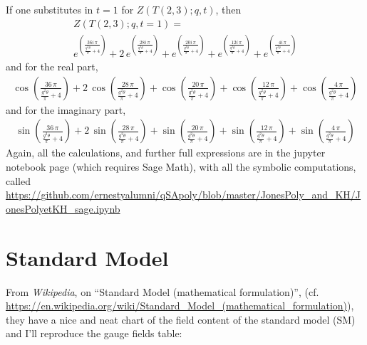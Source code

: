 \documentclass[10pt]{amsart}
\begin{document}
\begin{multicols}{2}

  If one substitutes in $t=1$ for $Z(T(2,3);q,t)$, then
  \[
\begin{gathered}
  Z(T(2,3);q,t=1) = \\
e^{\left(\frac{36 i \, \pi}{\frac{g^{2} \theta}{\pi} + 4}\right)} + 2 \, e^{\left(\frac{28 i \, \pi}{\frac{g^{2} \theta}{\pi} + 4}\right)} + e^{\left(\frac{20 i \, \pi}{\frac{g^{2} \theta}{\pi} + 4}\right)} + e^{\left(\frac{12 i \, \pi}{\frac{g^{2} \theta}{\pi} + 4}\right)} + e^{\left(\frac{4 i \, \pi}{\frac{g^{2} \theta}{\pi} + 4}\right)}
\end{gathered}
\]
and for the real part,
\[
\begin{gathered}
  \cos\left(\frac{36 \, \pi}{\frac{g^{2} \theta}{\pi} + 4}\right) + 2 \, \cos\left(\frac{28 \, \pi}{\frac{g^{2} \theta}{\pi} + 4}\right) + \cos\left(\frac{20 \, \pi}{\frac{g^{2} \theta}{\pi} + 4}\right) + \cos\left(\frac{12 \, \pi}{\frac{g^{2} \theta}{\pi} + 4}\right) + \cos\left(\frac{4 \, \pi}{\frac{g^{2} \theta}{\pi} + 4}\right)
  \end{gathered}
\]
and for the imaginary part,
\[
\begin{gathered}
\sin\left(\frac{36 \, \pi}{\frac{g^{2} \theta}{\pi} + 4}\right) + 2 \, \sin\left(\frac{28 \, \pi}{\frac{g^{2} \theta}{\pi} + 4}\right) + \sin\left(\frac{20 \, \pi}{\frac{g^{2} \theta}{\pi} + 4}\right) + \sin\left(\frac{12 \, \pi}{\frac{g^{2} \theta}{\pi} + 4}\right) + \sin\left(\frac{4 \, \pi}{\frac{g^{2} \theta}{\pi} + 4}\right)
  \end{gathered}
\]
Again, all the calculations, and further full expressions are in the jupyter notebook page (which requires Sage Math), with all the symbolic computations, called \url{https://github.com/ernestyalumni/qSApoly/blob/master/JonesPoly_and_KH/JonesPolyetKH\_sage.ipynb}





\section{Standard Model}

From \emph{Wikipedia}, on ``Standard Model (mathematical formulation)'', (cf. \url{https://en.wikipedia.org/wiki/Standard_Model_(mathematical_formulation)}), they have a nice and neat chart of the field content of the standard model (SM) and I'll reproduce the gauge fields table:


\end{multicols}
\end{document}
